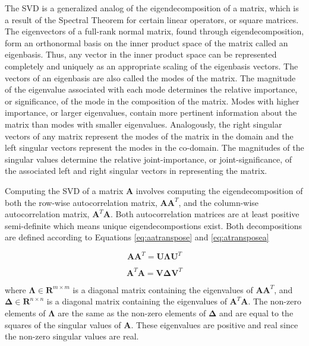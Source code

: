 \documentclass[conference]{IEEEtran}
\begin{document}
    The SVD is a generalized analog of the eigendecomposition of a matrix, which is a result of the Spectral Theorem for certain linear operators, or square matrices. The eigenvectors of a full-rank normal matrix, found through eigendecomposition, form an orthonormal basis on the inner product space of the matrix called an eigenbasis. Thus, any vector in the inner product space can be represented completely and uniquely as an appropriate scaling of the eigenbasis vectors. The vectors of an eigenbasis are also called the modes of the matrix. The magnitude of the eigenvalue associated with each mode determines the relative importance, or significance, of the mode in the composition of the matrix. Modes with higher importance, or larger eigenvalues, contain more pertinent information about the matrix than modes with smaller eigenvalues. Analogously, the right singular vectors of any matrix represent the modes of the matrix in the domain and the left singular vectors represent the modes in the co-domain. The magnitudes of the singular values determine the relative joint-importance, or joint-significance, of the associated left and right singular vectors in representing the matrix.

    Computing the SVD of a matrix $\mathbf{A}$ involves computing the eigendecomposition of both the row-wise autocorrelation matrix, $\mathbf{AA}^T$, and the column-wise autocorrelation matrix, $\mathbf{A}^T\mathbf{A}$. Both autocorrelation matrices are at least positive semi-definite which means unique eigendecompostions exist. Both decompositions are defined according to Equations \ref{eq:aatranspose} and \ref{eq:atransposea}

    \begin{equation}
         \mathbf{AA}^{T} = \mathbf{U\Lambda}\mathbf{U}^T
    \label{eq:aatranspose}
    \end{equation}

    \begin{equation}
         \mathbf{A}^T\mathbf{A} = \mathbf{V\Delta}\mathbf{V}^T
    \label{eq:atransposea}
    \end{equation}
    
    where $\mathbf{\Lambda} \in \mathbf{R}^{m \times m}$ is a diagonal matrix containing the eigenvalues of $\mathbf{AA}^{T}$, and $\mathbf{\Delta} \in \mathbf{R}^{n \times n}$ is a diagonal matrix containing the eigenvalues of $\mathbf{A}^T\mathbf{A}$. The non-zero elements of $\mathbf{\Lambda}$ are the same as the non-zero elements of $\mathbf{\Delta}$ and are equal to the squares of the singular values of $\mathbf{A}$. These eigenvalues are positive and real since the non-zero singular values are real.
    
\end{document}
